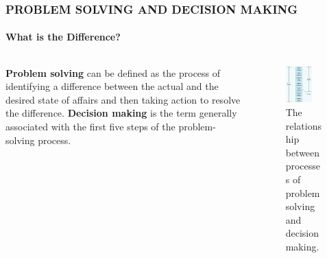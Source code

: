 \documentclass[14 pt]{beamer}
\begin{document}
\begin{frame}[t]
\frametitle{PROBLEM SOLVING AND DECISION MAKING}
\framesubtitle{What is the Difference?}

\begin{columns}[t]
\begin{column}{0.45\textwidth}
\textbf{Problem solving} can be defined as the process of identifying a difference between the actual and the desired state of affairs and then taking action to resolve the difference.
\vskip0.5cm%
\textbf{Decision making} is the term generally associated with the first five steps of the problem-solving process.
\end{column}
\begin{column}{0.45\textwidth}
\begin{figure}[t]
\includegraphics[width=0.7\textwidth]{img/problem-solving-decision-making}
\caption{The relationship between processes of problem solving and decision making.}
\end{figure}

\end{column}
\end{columns}
\end{frame}

\end{document}
